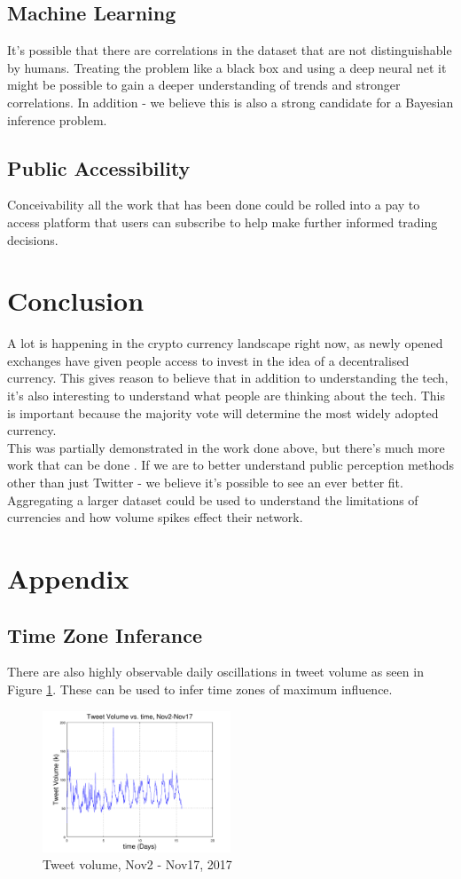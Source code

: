 \documentclass[12pt,journal,compsoc]{IEEEtran}
\begin{document}
\subsection{Machine Learning}
It's possible that there are correlations in the dataset that are not distinguishable by humans. Treating the problem
like a black box and using a deep neural net it might be possible to gain a deeper understanding of trends and stronger
correlations. In addition - we believe this is also a strong candidate for a Bayesian inference problem.

\subsection{Public Accessibility}
Conceivability all the work that has been done could be rolled into a pay to access platform that users can subscribe to help
make further informed trading decisions.

\section{Conclusion}
A lot is happening in the crypto currency landscape right now, as newly opened exchanges have given people access to invest in
the idea of a decentralised currency. This gives reason to believe that in addition to understanding 
the tech, it's also interesting to understand what people are thinking about the tech. This is important because the majority 
vote will determine the most widely adopted currency.\\

This was partially demonstrated in the work done above, but there's much more work that can be done . If we
are to better understand public perception methods other than just Twitter - we believe it's possible to see an ever better fit.
Aggregating a larger dataset could be used to understand the limitations of currencies and how volume spikes effect their
network. 

\section{Appendix}
\subsection{Time Zone Inferance}
There are also highly observable daily oscillations in tweet volume as seen in Figure \ref{fig:OSC}. 
These can be used to infer time zones of maximum influence.
\begin{figure}[h!]
	\centering
	\includegraphics[width=0.5\textwidth]{../Datasets/Plots/TweetVolume}
	\caption{Tweet volume, Nov2 - Nov17, 2017}
	\label{fig:OSC}
\end{figure}
\end{document}
